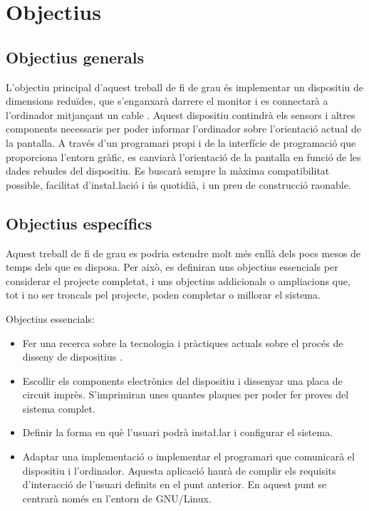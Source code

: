 \chapter{Objectius}
\label{cap:objectius}

\section{Objectius generals}

L'objectiu principal d'aquest treball de fi de grau és implementar un dispositiu
de dimensions reduïdes, que s'enganxarà darrere el monitor i es connectarà
a l'ordinador mitjançant un cable . Aquest dispositiu contindrà els
sensors i altres components necessaris per poder informar l'ordinador sobre
l'orientació actual de la pantalla. A través d'un programari propi i de la
interfície de programació que proporciona l'entorn gràfic, es canviarà
l'orientació de la pantalla en funció de les dades rebudes del dispositiu. Es
buscarà sempre la màxima compatibilitat possible, facilitat d'insta\l.lació i
ús quotidià, i un preu de construcció raonable.


\section{Objectius específics}

Aquest treball de fi de grau es podria estendre molt més enllà dels pocs mesos
de temps dels que es disposa. Per això, es definiran uns objectius essencials
per considerar el projecte completat, i uns objectius addicionals o
ampliacions que, tot i no ser troncals pel projecte, poden completar o
millorar el sistema.

Objectius essencials:
\begin{itemize}
    \item Fer una recerca sobre la tecnologia i pràctiques actuals sobre el 
    procés de disseny de dispositius .
    \item Escollir els components electrònics del dispositiu i dissenyar una
    placa de circuit imprès. S'imprimiran unes quantes plaques per poder fer
    proves del sistema complet.
    \item Definir la forma en què l'usuari podrà insta\l.lar i configurar
    el sistema.
    \item Adaptar una implementació o implementar el programari que comunicarà
    el dispositiu i l'ordinador. Aquesta aplicació haurà de complir els
    requisits d'interacció de l'usuari definits en el punt anterior. En aquest
    punt se centrarà només en l'entorn de GNU/Linux.
\end{itemize}

